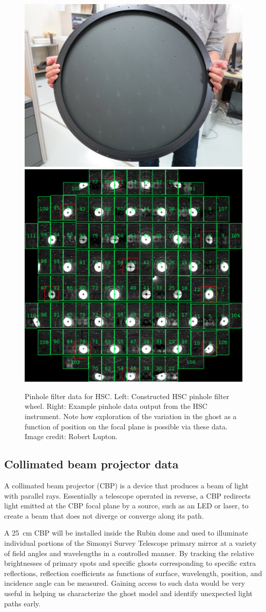 \documentclass[SE,authoryear,toc]{lsstdoc}
\begin{document}
\begin{figure}
\centering
\includegraphics[height=0.4\textwidth]{fig/pinhole_filter_hsc}
\includegraphics[height=0.4\textwidth]{fig/pinhole_904720}
\caption{
Pinhole filter data for HSC.
Left: Constructed HSC pinhole filter wheel.
Right: Example pinhole data output from the HSC instrument.
Note how exploration of the variation in the ghost as a function of position on the focal plane is possible via these data.
Image credit: Robert Lupton.
}
\label{fig:pinhole_hsc}
\end{figure}

\subsection{Collimated beam projector data}  \label{sec:cbp}

A collimated beam projector (CBP) is a device that produces a beam of light with parallel rays.
Essentially a telescope operated in reverse, a CBP redirects light emitted at the CBP focal plane by a source, such as an LED or laser, to create a beam that does not diverge or converge along its path.

A 25~cm CBP will be installed inside the Rubin dome and used to illuminate individual portions of the Simonyi Survey Telescope primary mirror at a variety of field angles and wavelengths in a controlled manner.
By tracking the relative brightnesses of primary spots and specific ghosts corresponding to specific extra reflections, reflection coefficients as functions of surface, wavelength, position, and incidence angle can be measured.
Gaining access to such data would be very useful in helping us characterize the ghost model and identify unexpected light paths early.
\end{document}

